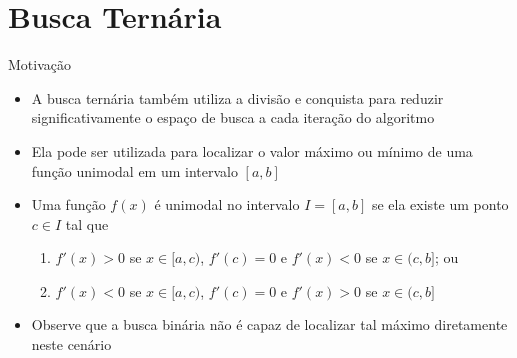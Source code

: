 \section{Busca Ternária}

\begin{frame}[fragile]{Motivação}

    \begin{itemize}
        \item A busca ternária também utiliza a divisão e conquista para reduzir significativamente
            o espaço de busca a cada iteração do algoritmo

        \item Ela pode ser utilizada para localizar o valor máximo ou
            mínimo de uma função unimodal em um intervalo $[a, b]$

        \item Uma função $f(x)$ é unimodal no intervalo $I = [a, b]$ se ela existe um ponto 
            $c\in I$ tal que
            \begin{enumerate}
                \item $f'(x) > 0$ se $x \in[a, c)$, $f'(c) = 0$ e $f'(x) < 0$ se $x\in (c, b]$; ou
                \item $f'(x) < 0$ se $x \in[a, c)$, $f'(c) = 0$ e $f'(x) > 0$ se $x\in (c, b]$
            \end{enumerate}

        \item Observe que a busca binária não é capaz de localizar tal máximo diretamente
            neste cenário
    \end{itemize}

\end{frame}




